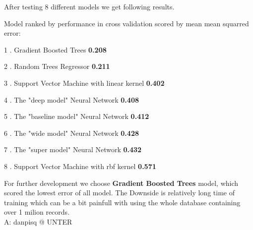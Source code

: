 \documentclass[11pt]{article}
\begin{document}
    After testing 8 different models we get following results.

Model ranked by performance in cross validation scored by mean mean
squarred error:

1 . Gradient Boosted Trees \textbf{0.208}

2 . Random Trees Regressor \textbf{0.211}

3 . Support Vector Machine with linear kernel \textbf{0.402}

4 . The "deep model" Neural Network \textbf{0.408}

5 . The "baseline model" Neural Network \textbf{0.412}

6 . The "wide model" Neural Network \textbf{0.428}

7 . The "super model" Neural Network \textbf{0.432}

8 . Support Vector Machine with rbf kernel \textbf{0.571}

    

    

\noindent    For further development we choose \textbf{Gradient Boosted Trees} model,
which scored the lowest error of all model. The Downside is relatively
long time of training which can be a bit painfull with using the whole
database containing over 1 milion records. \\


\noindent A: danpisq @ UNTER


    
    
    
    
\end{document}
